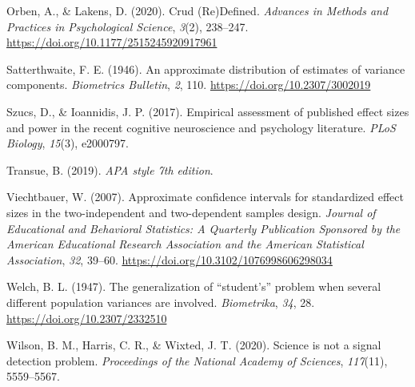 \documentclass[
  man]{apa7}
\newlength{\cslhangindent}
\newlength{\cslentryspacingunit} %
\newenvironment{CSLReferences}[2] %
 {%
  \setlength{\parindent}{0pt}
  \ifodd #1
  \let\oldpar\par
  \def\par{\hangindent=\cslhangindent\oldpar}
  \fi
  \setlength{\parskip}{#2\cslentryspacingunit}
 }%
 {}
\begin{document}
\begin{CSLReferences}{1}{0}
\leavevmode{}%
Orben, A., \& Lakens, D. (2020). Crud ({Re}){Defined}. \emph{Advances in Methods and Practices in Psychological Science}, \emph{3}(2), 238--247. \url{https://doi.org/10.1177/2515245920917961}

\leavevmode{}%
Satterthwaite, F. E. (1946). An approximate distribution of estimates of variance components. \emph{Biometrics Bulletin}, \emph{2}, 110. \url{https://doi.org/10.2307/3002019}

\leavevmode{}%
Szucs, D., \& Ioannidis, J. P. (2017). Empirical assessment of published effect sizes and power in the recent cognitive neuroscience and psychology literature. \emph{PLoS Biology}, \emph{15}(3), e2000797.

\leavevmode{}%
Transue, B. (2019). \emph{APA style 7th edition}.

\leavevmode{}%
Viechtbauer, W. (2007). Approximate confidence intervals for standardized effect sizes in the two-independent and two-dependent samples design. \emph{Journal of Educational and Behavioral Statistics: A Quarterly Publication Sponsored by the American Educational Research Association and the American Statistical Association}, \emph{32}, 39--60. \url{https://doi.org/10.3102/1076998606298034}

\leavevmode{}%
Welch, B. L. (1947). The generalization of {``student's''} problem when several different population variances are involved. \emph{Biometrika}, \emph{34}, 28. \url{https://doi.org/10.2307/2332510}

\leavevmode{}%
Wilson, B. M., Harris, C. R., \& Wixted, J. T. (2020). Science is not a signal detection problem. \emph{Proceedings of the National Academy of Sciences}, \emph{117}(11), 5559--5567.

\end{CSLReferences}
\end{document}
